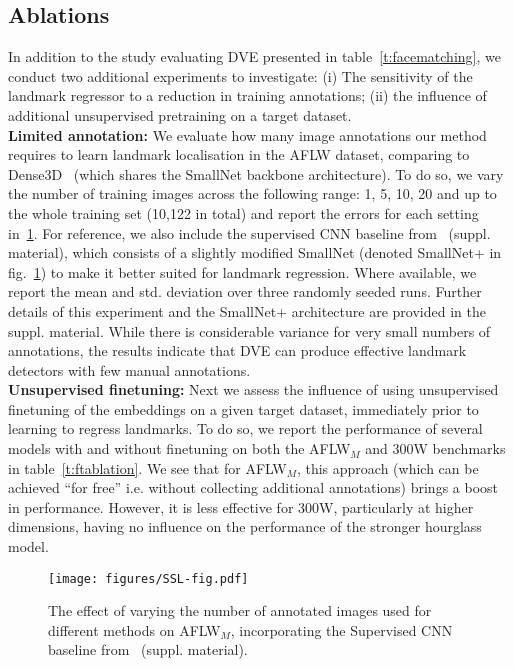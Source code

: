 \documentclass[10pt,twocolumn,letterpaper]{article}
\begin{document}
\subsection{Ablations}\label{subsec:ablations}

In addition to the study evaluating DVE presented in table~\ref{t:facematching}, we conduct two additional experiments to investigate: (i) The sensitivity of the landmark regressor to a reduction in training annotations; (ii) the influence of additional unsupervised pretraining on a target dataset.\\

\noindent \textbf{Limited annotation:} We evaluate how many image annotations our method requires to learn landmark localisation in the AFLW dataset, comparing to Dense3D~\cite{thewlis17Bunsupervised} (which shares the SmallNet backbone architecture).
To do so, we vary the number of training images across the following range: 1, 5, 10, 20 and up to the whole training set (10,122 in total) and report the errors for each setting in~\cref{f:ntrainchart}.   For reference, we also include the supervised CNN baseline from~\cite{thewlis17unsupervised} (suppl. material), which consists of a slightly modified SmallNet (denoted SmallNet+ in fig.~\ref{f:ntrainchart}) to make it better suited for landmark regression.  Where available, we report the mean and std. deviation over three randomly seeded runs.  Further details of this experiment and the SmallNet+ architecture are provided in the suppl. material.  While there is considerable variance for very small numbers of annotations, the results indicate that DVE can produce effective landmark detectors with few manual annotations. \\

\noindent \textbf{Unsupervised finetuning:} Next we assess the influence of using unsupervised finetuning of the embeddings on a given target dataset, immediately prior to learning to regress landmarks.  To do so, we report the performance of several models with and without finetuning on both the AFLW$_M$ and 300W benchmarks in table~\ref{t:ftablation}.  We see that for AFLW$_M$, this approach (which can be achieved ``for free'' i.e. without collecting additional annotations) brings a boost in performance.  However, it is less effective for 300W, particularly at higher dimensions, having no influence on the performance of the stronger hourglass model. 


\begin{figure}[t]
\centering
\texttt{[image: figures/SSL-fig.pdf]}
\caption{The effect of varying the number of annotated images used for different methods on AFLW$_M$, incorporating the Supervised CNN baseline from~\cite{thewlis17unsupervised} (suppl. material). } 
\label{f:ntrainchart}
\vspace{-0.1cm}
\end{figure}
\end{document}
